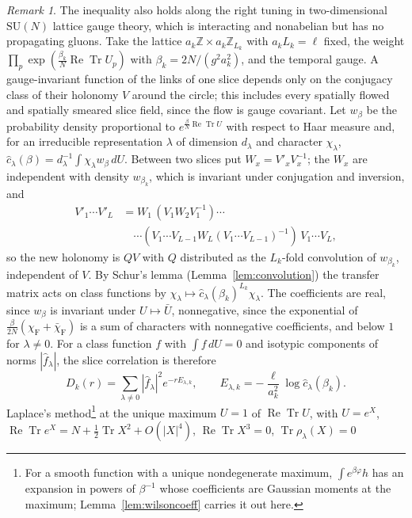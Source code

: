 \documentclass[aps,prd,twocolumn,superscriptaddress,nofootinbib,longbibliography,floatfix,amsmath,amssymb,10pt]{revtex4-2}
\theoremstyle{definition}
\theoremstyle{remark}
\newtheorem{remark}[theorem]{Remark}
\newcommand{\Z}{\mathbb{Z}}
\newcommand{\SU}{\mathrm{SU}}
\newcommand{\ReTr}{\operatorname{Re}\operatorname{Tr}}
\begin{document}
\begin{remark}\label{rem:twodslice}
The inequality also holds along the right tuning in two-dimensional $\SU(N)$
lattice gauge theory, which is interacting and nonabelian but has no
propagating gluons. Take the lattice $a_k\Z\times a_k\Z_{L_k}$ with
$a_kL_k=\ell$ fixed, the weight $\prod_p\exp(\frac{\beta_k}N\ReTr U_p)$ with
$\beta_k=2N/(g^2a_k^2)$, and the temporal gauge. A gauge-invariant function
of the links of one slice depends only on the conjugacy class of their
holonomy $V$ around the circle; this includes every spatially flowed and
spatially smeared slice field, since the flow is gauge covariant. Let
$w_\beta$ be the probability density proportional to
$e^{\frac\beta N\ReTr U}$ with respect to Haar measure and, for an irreducible
representation $\lambda$ of dimension $d_\lambda$ and character
$\chi_\lambda$, $\hat c_\lambda(\beta)=d_\lambda^{-1}\int\chi_\lambda
w_\beta\,dU$. Between two slices put $W_x=V'_xV_x^{-1}$; the $W_x$ are
independent with density $w_{\beta_k}$, which is invariant under conjugation
and inversion, and
\[
\begin{split}
V'_1\cdots V'_{L}&=W_1\,(V_1W_2V_1^{-1})\cdots\\
&\quad\cdots(V_1\cdots V_{L-1}W_{L}(V_1\cdots V_{L-1})^{-1})\,V_1\cdots V_{L},
\end{split}
\]
so the new holonomy is $QV$ with $Q$ distributed as the $L_k$-fold
convolution of $w_{\beta_k}$, independent of $V$. By Schur's lemma (Lemma~\ref{lem:convolution}) the
transfer matrix acts on class functions by $\chi_\lambda\mapsto\hat
c_\lambda(\beta_k)^{L_k}\chi_\lambda$. The coefficients are real, since
$w_\beta$ is invariant under $U\mapsto\bar U$, nonnegative, since the
exponential of $\frac\beta{2N}(\chi_{\mathrm F}+\bar\chi_{\mathrm F})$ is a sum of
characters with nonnegative coefficients, and below $1$ for
$\lambda\ne0$. For a class function $f$ with $\int f\,dU=0$ and isotypic
components of norms $|\hat f_\lambda|$, the slice correlation is therefore
\[
D_k(r)=\sum_{\lambda\ne0}|\hat f_\lambda|^2e^{-rE_{\lambda,k}},\qquad
E_{\lambda,k}=-\frac{\ell}{a_k^2}\log\hat c_\lambda(\beta_k).
\]
Laplace's method\footnote{For a smooth function with a unique nondegenerate maximum, $\int e^{\beta\varphi}h$ has an expansion in powers of $\beta^{-1}$ whose coefficients are Gaussian moments at the maximum; Lemma~\ref{lem:wilsoncoeff} carries it out here.} at the unique maximum $U=1$ of $\ReTr U$, with
$U=e^X$, $\ReTr e^X=N+\frac12\operatorname{Tr}X^2+O(|X|^4)$,
$\operatorname{Re}\operatorname{Tr}X^3=0$, $\operatorname{Tr}\rho_\lambda(X)=0$

\end{remark}
\end{document}
